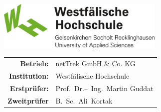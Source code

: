 \begin{titlepage}
    \maketitle
    \vspace*{\fill}
    \begin{flushleft}
        
    \end{flushleft}
    \vspace{1cm}
    \begin{flushright}
        \includegraphics[width={0.6\textwidth}]{../assets/img/whs}
    \end{flushright}
    \vspace*{\fill}
    \begin{large}
        \begin{tabular}{r l}
            \textbf{Betrieb:}     & netTrek GmbH \& Co. KG         \\
            \textbf{Institution:} & Westfälische Hochschule        \\
            \textbf{Erstprüfer:}  & Prof.~Dr.--~Ing.~Martin Guddat \\
            \textbf{Zweitprüfer}  & B.~Sc.~Ali~Kortak              \\
        \end{tabular}
    \end{large}
\end{titlepage}